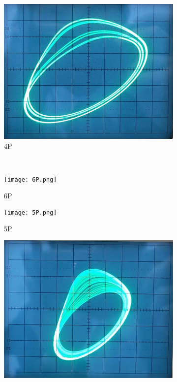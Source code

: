 \documentclass[12pt,a4paper]{article}
\begin{document}
\begin{figure}[H]
\begin{subfigure}[b]{0.3\textwidth}
      \centering
      \includegraphics[width=\textwidth]{4P.png}
      \caption{4P}
    \end{subfigure}
    \\
    \begin{subfigure}[b]{0.3\textwidth}
        \centering
        \texttt{[image: 6P.png]}
        \caption{6P}
      \end{subfigure}
      \hfill
      \begin{subfigure}[b]{0.3\textwidth}
        \centering
        \texttt{[image: 5P.png]}
        \caption{5P}
      \end{subfigure}
      \hfill
      \begin{subfigure}[b]{0.3\textwidth}
        \centering
        \includegraphics[width=\textwidth]{阵发混沌.png}

\end{subfigure}
\end{figure}
\end{document}
